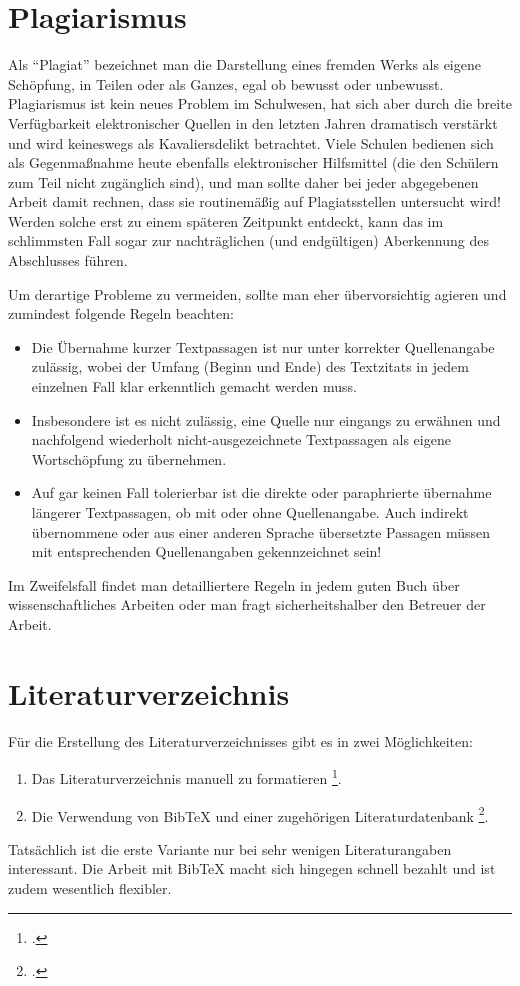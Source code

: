 \section{Plagiarismus}

Als "`Plagiat"' bezeichnet man die Darstellung eines fremden Werks als eigene Schöpfung, 
in Teilen oder als Ganzes, egal ob bewusst oder unbewusst.
Plagiarismus ist kein neues Problem im Schulwesen, hat sich aber durch die 
breite Verfügbarkeit elektronischer Quellen in den letzten Jahren dramatisch 
verstärkt und wird keineswegs als Kavaliersdelikt betrachtet.
Viele Schulen bedienen sich als Gegenmaßnahme heute ebenfalls elektronischer Hilfsmittel 
(die den Schülern zum Teil nicht zugänglich sind), und man sollte daher bei
jeder abgegebenen Arbeit damit rechnen, dass sie routinemäßig auf Plagiatsstellen untersucht wird!
Werden solche erst zu einem späteren Zeitpunkt entdeckt, kann das im schlimmsten Fall sogar 
zur nachträglichen (und endgültigen) Aberkennung des Abschlusses führen.

Um derartige Probleme zu vermeiden, sollte man eher übervorsichtig agieren und zumindest folgende Regeln beachten:
%
\begin{itemize}
\item
Die Übernahme kurzer Textpassagen ist nur unter korrekter Quellenangabe zulässig, wobei der Umfang (Beginn und Ende) des Textzitats in jedem einzelnen Fall klar erkenntlich gemacht werden muss. 
\item
Insbesondere ist es nicht zulässig, eine Quelle nur eingangs zu erwähnen und nachfolgend wiederholt nicht-ausgezeichnete Textpassagen als eigene Wortschöpfung zu übernehmen. 
\item
Auf gar keinen Fall tolerierbar ist die direkte oder paraphrierte übernahme längerer Textpassagen, ob mit oder ohne Quellenangabe. Auch indirekt übernommene oder aus einer anderen Sprache übersetzte Passagen müssen mit entsprechenden Quellenangaben gekennzeichnet sein! 
\end{itemize}
%
Im Zweifelsfall findet man detailliertere Regeln in jedem guten Buch über wissenschaftliches Arbeiten oder man fragt sicherheitshalber den Betreuer der Arbeit.



\section{Literaturverzeichnis}

Für die Erstellung des Literaturverzeichnisses gibt es in \latex zwei
Möglichkeiten:
\begin{enumerate}
\item Das Literaturverzeichnis manuell zu formatieren \footcite[siehe][S.\ 56--57]{Kopka98}.
\item Die Verwendung von BibTeX und einer zugehörigen Literaturdatenbank
\footcite[siehe][S.\ 245--255]{Kopka98}.
\end{enumerate}
Tatsächlich ist die erste Variante nur bei sehr wenigen Literaturangaben interessant.
Die Arbeit mit BibTeX macht sich hingegen schnell bezahlt und ist zudem wesentlich
flexibler.

